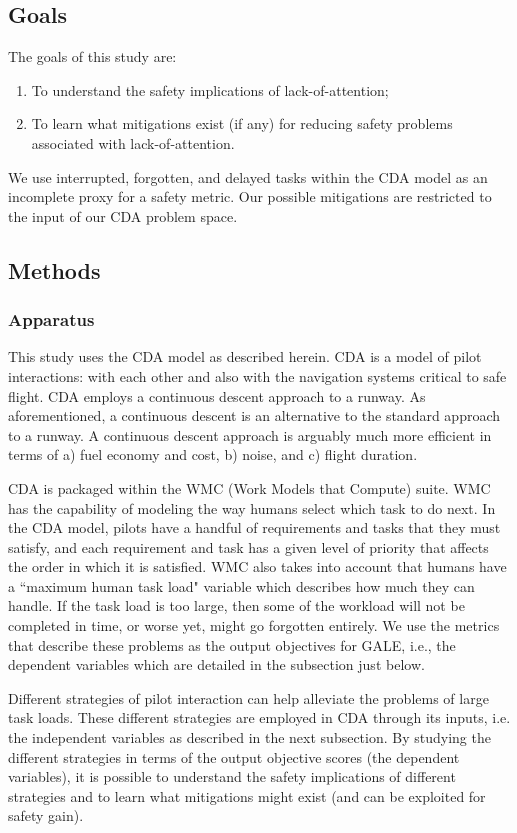 \documentclass[journal]{IEEEtran}
\newcommand{\be}{\begin{enumerate}}
\newcommand{\ee}{\end{enumerate}}
\newcommand{\ADD}[1]{#1}
\begin{document}
\subsection{Goals}

The goals of this study are:
\be
\item
To understand the safety implications of lack-of-attention;
\item
To learn what mitigations exist (if any) for reducing safety problems associated with lack-of-attention.
\ee
\ADD{We use interrupted, forgotten, and delayed tasks within the CDA model as an incomplete proxy for a safety metric.
Our possible mitigations are restricted to the input of our CDA problem space.}


\subsection{Methods}
\subsubsection{Apparatus}

This study uses the CDA model as described herein. 
CDA is a model of pilot interactions: with each other and also with the navigation systems critical to safe flight.  
CDA employs a continuous descent approach to a runway. 
As aforementioned, a continuous descent is an alternative to the standard approach to a runway.
A continuous descent approach is arguably much more efficient in terms of a) fuel economy and cost, b) noise, and c) flight duration.

CDA is packaged within the WMC (Work Models that Compute) suite.  
WMC has the capability of modeling the way humans select which task to do next.
In the CDA model, pilots have a handful of requirements and tasks that they must satisfy, and each requirement and task has a given level of priority that affects the order in which it is satisfied.
WMC also takes into account that humans have a ``maximum human task load" variable which describes how much they can handle.  
If the task load is too large, then some of the workload will not be completed in time, or worse yet, might go forgotten entirely.  
We use the metrics that describe these problems as the output objectives for GALE, i.e., the dependent variables which are detailed in the subsection just below.

Different strategies of pilot interaction can help alleviate the problems of large task loads.  These different strategies are employed in CDA through its inputs, i.e. the independent variables as described in the next subsection.  
By studying the different strategies in terms of the output objective scores (the dependent variables), it is possible to understand the safety implications of different strategies and to learn what mitigations might exist (and can be exploited for safety gain).
\end{document}
